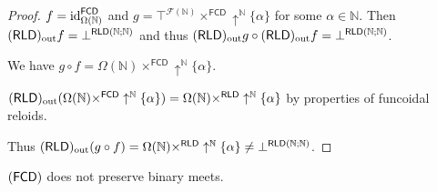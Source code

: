 \begin{proof}
$f=\operatorname{id}_{\Omega(\mathbb{N})}^{\mathsf{FCD}}$ and $g=\top^{\mathscr{F}(\mathbb{N})}\times^{\mathsf{FCD}}\uparrow^{\mathbb{N}}\{\alpha\}$
for some $\alpha\in\mathbb{N}$. Then $(\mathsf{RLD})_{\mathrm{out}} f=\bot^{\mathsf{RLD}(\mathbb{N};\mathbb{N})}$
and thus $(\mathsf{RLD})_{\mathrm{out}} g\circ(\mathsf{RLD})_{\mathrm{out}} f=\bot^{\mathsf{RLD}(\mathbb{N};\mathbb{N})}$.

We have $g\circ f=\Omega(\mathbb{N})\times^{\mathsf{FCD}}\uparrow^{\mathbb{N}}\{\alpha\}$.

$(\mathsf{RLD})_{\mathrm{out}}(\Omega(\mathbb{N})\times^{\mathsf{FCD}}\uparrow^{\mathbb{N}}\{\alpha\})=\Omega(\mathbb{N})\times^{\mathsf{RLD}}\uparrow^{\mathbb{N}}\{\alpha\}$
by properties of funcoidal reloids.




Thus $(\mathsf{RLD})_{\mathrm{out}}(g\circ f)=\Omega(\mathbb{N})\times^{\mathsf{RLD}}\uparrow^{\mathbb{N}}\{\alpha\}\ne\bot^{\mathsf{RLD}(\mathbb{N};\mathbb{N})}$.\end{proof}
\begin{example}
$(\mathsf{FCD})$ does not preserve binary meets.\end{example}
